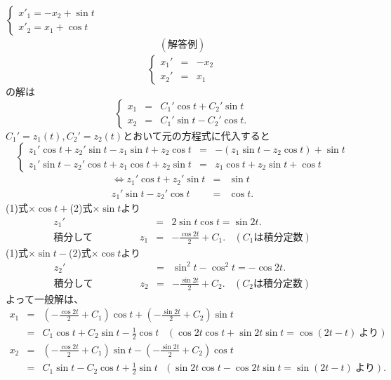 \documentclass[a4paper,11pt,fleqn]{jarticle}
\begin{document}
\subsubsection{}
$\left\{ \begin{array}{l}
{x'}_1=-x_2+\sin t \\
{x'}_2= x_1+\cos t
\end{array} \right.$
\begin{eqnarray*}
(解答例)
\end{eqnarray*}
\[
\left\{
\begin{array}{rcl}
x_1' &=& -x_2 \\
x_2' &=& x_1
\end{array}
\right.
\]
の解は
\[
\left\{
\begin{array}{rcl}
x_1 &=& C_1'\cos t+C_2'\sin t \\
x_2 &=& C_1'\sin t-C_2'\cos t.
\end{array}
\right.
\]
$C_1'=z_1(t),C_2'=z_2(t)$とおいて元の方程式に代入すると
\[
\left\{
\begin{array}{rcl}
z_1'\cos t+z_2'\sin t-z_1\sin t+z_2\cos t &=& -(z_1\sin t-z_2\cos t)+\sin t \\
z_1'\sin t-z_2'\cos t+z_1\cos t+z_2\sin t &=& z_1\cos t+z_2\sin t+\cos t
\end{array}
\right. 
\]
\begin{eqnarray}
\Leftrightarrow
z_1'\cos t+z_2'\sin t &=& \sin t
\label{1} \\
z_1'\sin t-z_2'\cos t &=& \cos t. \label{2} 
\end{eqnarray}
(1)式$\times \cos t+$(2)式$\times \sin t$より
\begin{eqnarray*}
z_1' &=& 2\sin t\cos t=\sin2t. \\
積分して \hspace{2cm} z_1 &=& -\frac{\cos2t}2+C_1. \ \ \ \ (C_1は積分定数)
\end{eqnarray*}
(1)式$\times \sin t-$(2)式$\times \cos t$より
\begin{eqnarray*}
z_2' &=& \sin^2t-\cos^2 t=-\cos2t. \\
積分して \hspace{2cm} z_2 &=& -\frac{\sin2t}2+C_2. \ \ \ \ (C_2は積分定数)
\end{eqnarray*}
よって一般解は、
\begin{eqnarray*}
x_1 &=& \left(-\frac{\cos2t}2+C_1\right)\cos t+\left(-\frac{\sin2t}2+C_2\right)\sin t \\
&=& C_1\cos t+C_2\sin t-\frac12\cos t \; \; \; (\cos2t\cos t+\sin2t\sin t=\cos(2t-t)\ より) \\
x_2 &=& \left(-\frac{\cos2t}2+C_1\right)\sin t-\left(-\frac{\sin2t}2+C_2\right)\cos t \\
&=& C_1\sin t-C_2\cos t+\frac12\sin t \ \ \ ( \sin2t\cos t-\cos2t\sin t=\sin(2t-t)\ より).
\end{eqnarray*}
\end{document}
